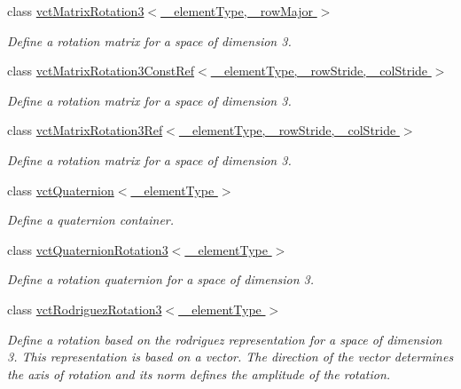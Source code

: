 \begin{DoxyCompactItemize}
class \hyperlink{classvct_matrix_rotation3}{vct\-Matrix\-Rotation3$<$ \-\_\-element\-Type, \-\_\-row\-Major $>$}
\begin{DoxyCompactList}\small\item\em Define a rotation matrix for a space of dimension 3. \end{DoxyCompactList}\item 
class \hyperlink{classvct_matrix_rotation3_const_ref}{vct\-Matrix\-Rotation3\-Const\-Ref$<$ \-\_\-element\-Type, \-\_\-row\-Stride, \-\_\-col\-Stride $>$}
\begin{DoxyCompactList}\small\item\em Define a rotation matrix for a space of dimension 3. \end{DoxyCompactList}\item 
class \hyperlink{classvct_matrix_rotation3_ref}{vct\-Matrix\-Rotation3\-Ref$<$ \-\_\-element\-Type, \-\_\-row\-Stride, \-\_\-col\-Stride $>$}
\begin{DoxyCompactList}\small\item\em Define a rotation matrix for a space of dimension 3. \end{DoxyCompactList}\item 
class \hyperlink{classvct_quaternion}{vct\-Quaternion$<$ \-\_\-element\-Type $>$}
\begin{DoxyCompactList}\small\item\em Define a quaternion container. \end{DoxyCompactList}\item 
class \hyperlink{classvct_quaternion_rotation3}{vct\-Quaternion\-Rotation3$<$ \-\_\-element\-Type $>$}
\begin{DoxyCompactList}\small\item\em Define a rotation quaternion for a space of dimension 3. \end{DoxyCompactList}\item 
class \hyperlink{classvct_rodriguez_rotation3}{vct\-Rodriguez\-Rotation3$<$ \-\_\-element\-Type $>$}
\begin{DoxyCompactList}\small\item\em Define a rotation based on the rodriguez representation for a space of dimension 3. This representation is based on a vector. The direction of the vector determines the axis of rotation and its norm defines the amplitude of the rotation. \end{DoxyCompactList}\end{DoxyCompactItemize}
